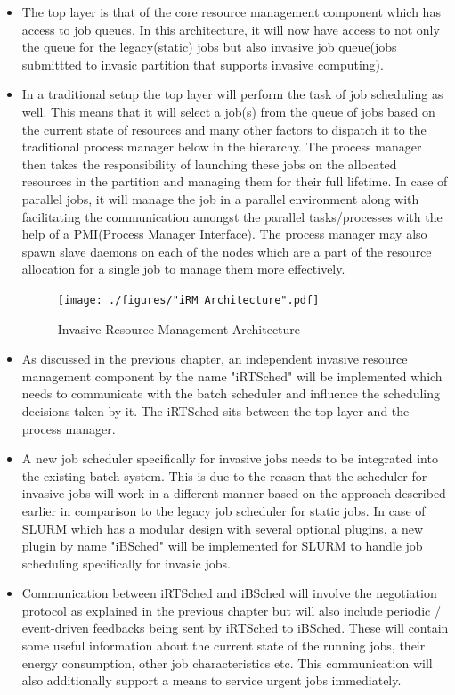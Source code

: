 \begin{itemize}
\item The top layer is that of the core resource management component which has access to job queues. In this architecture, it will now have access to not only the queue for the legacy(static) jobs but also invasive job queue(jobs submittted to invasic partition that supports invasive computing).
\item In a traditional setup the top layer will perform the task of job scheduling as well. This means that it will select a job(s) from the queue of jobs based on the current state of resources and many other factors to dispatch it to the traditional process manager below in the hierarchy. The process manager then takes the responsibility of launching these jobs on the allocated resources in the partition and managing them for their full lifetime. In case of parallel jobs, it will manage the job in a parallel environment along with facilitating the communication amongst the parallel tasks/processes with the help of a PMI(Process Manager Interface). The process manager may also spawn slave daemons on each of the nodes which are a part of the resource allocation for a single job to manage them more effectively.
\begin{figure}[!htbp]
\centering
\texttt{[image: ./figures/"iRM Architecture".pdf]}
\caption{Invasive Resource Management Architecture}
\label{fig:7}
\end{figure}
\item As discussed in the previous chapter, an independent invasive resource management component by the name "iRTSched" will be implemented which needs to communicate with the batch scheduler and influence the scheduling decisions taken by it. The iRTSched sits between the top layer and the process manager.
\item A new job scheduler specifically for invasive jobs needs to be integrated into the existing batch system. This is due to the reason that the scheduler for invasive jobs will work in a different manner based on the approach described earlier in comparison to the legacy job scheduler for static jobs. In case of SLURM which has a modular design with several optional plugins, a new plugin by name "iBSched" will be implemented for SLURM to handle job scheduling specifically for invasic jobs.
\item Communication between iRTSched and iBSched will involve the negotiation protocol as explained in the previous chapter but will also include periodic / event-driven feedbacks being sent by iRTSched to iBSched. These will contain some useful information about the current state of the running jobs, their energy consumption, other job characteristics etc. This communication will also additionally support a means to service urgent jobs immediately.
\end{itemize}
